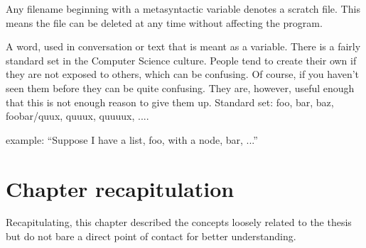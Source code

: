 \documentclass[proposal.tex]{subfiles}
\begin{document}
Any filename beginning with a metasyntactic variable denotes a scratch file. This means the file can be deleted at any time without affecting the program.



\cite{webste:metasyntacticvariablesc2wiki}

A word, used in conversation or text that is meant as a variable. There is a fairly standard set in the Computer Science
culture. People tend to create their own if they are not exposed to others, which can be confusing. Of course, if you haven't seen them before they can be quite confusing. They are, however, useful enough that this is not enough reason to give them up.
Standard set: foo, bar, baz, foobar/quux, quuux, quuuux, ....

example: ``Suppose I have a list, foo, with a node, bar, ...''


\section{Chapter recapitulation}
Recapitulating, this chapter described the concepts loosely related to the thesis but do not bare a direct point of contact for better 
understanding.
\end{document}
